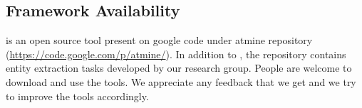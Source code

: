 \subsection{Framework Availability}
\framework is an open source tool present on google code under atmine repository (\url{https://code.google.com/p/atmine/}).
In addition to \framework, the repository contains entity extraction tasks developed by our research group.
People are welcome to download and use the tools.
We appreciate any feedback that we get and we try to improve the tools accordingly.

\begin{comment}
\subsection{\framework simulator}

The set of tag types ${\cal T}$ contains tuples of the form $\langle l,f,d\rangle$ 
where $l$ is a text label with a descriptive name, 
$f$ is an MRE, and $d$ is a visualization legend 
with font and color information.

For each word $t_i\in T, 0\le i < M, M=|T|$.
\framework computes a Boolean value 
($\{\mathit{true}, \mathit{false}\}$)
for all MBFs. 
Then, it computes the set of MBF tags
$R_i=\{(t_i,tt)| tt=\langle l,f,d\rangle \wedge
f~\mathit{is~an~MBF} \wedge f(t_i)\} \subseteq T \times {\cal T}$
which tags a word $t_i$ with $\mathit{tt}$ 
iff the MBF $f$ associated with
tag type $\mathit{tt}$ is true for $t_i$. 
The MBF evaluation results in a sequence of tag sets 
$\langle R_0, R_1, \ldots, R_{n-1}\rangle$.
If a word $t_i$ has no tag type match, 
its tag set $R_i$ is by default the singleton $O=\{\mathit{NONE}\}$.


For each MRE, 
\framework generates its equivalent non-deterministic finite automaton (NFA) in the typical manner~\cite{sipser2006introduction}. 
We support the upto operation ($f$\^{}$x$), which is not directly 
supported in ~\cite{sipser2006introduction}, by 
expanding it into a regular expression form; for example 
$f$\^{}$3$ is equivalent to $f?|ff|fff$. 
Consider the example of Figure~\ref{fig:intromotiv} and the
corresponding expression $(P|N)\!+~O?~R~O^\wedge 2~(P|N|U)+$. 
Figure~\ref{fig:nfaEx} shows part of the corresponding NFA where
$q_8, q_9, \dots, q_{13}$ represent NFA states,
and edges are transitions based on MBF tags such as 
$P,$ and $N$.
Edges labeled with the empty string $\epsilon$ are non-deterministic.


\end{comment}
